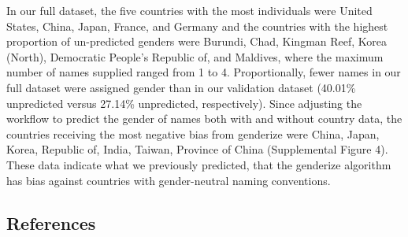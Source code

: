 \documentclass[11pt,]{article}
\begin{document}
In our full dataset, the five countries with the most individuals were
United States, China, Japan, France, and Germany and the countries with
the highest proportion of un-predicted genders were Burundi, Chad,
Kingman Reef, Korea (North), Democratic People's Republic of, and
Maldives, where the maximum number of names supplied ranged from 1 to 4.
Proportionally, fewer names in our full dataset were assigned gender
than in our validation dataset (40.01\% unpredicted versus 27.14\%
unpredicted, respectively). Since adjusting the workflow to predict the
gender of names both with and without country data, the countries
receiving the most negative bias from genderize were China, Japan,
Korea, Republic of, India, Taiwan, Province of China (Supplemental
Figure 4). These data indicate what we previously predicted, that the
genderize algorithm has bias against countries with gender-neutral
naming conventions.

\subsection{References}\label{references}
\end{document}
